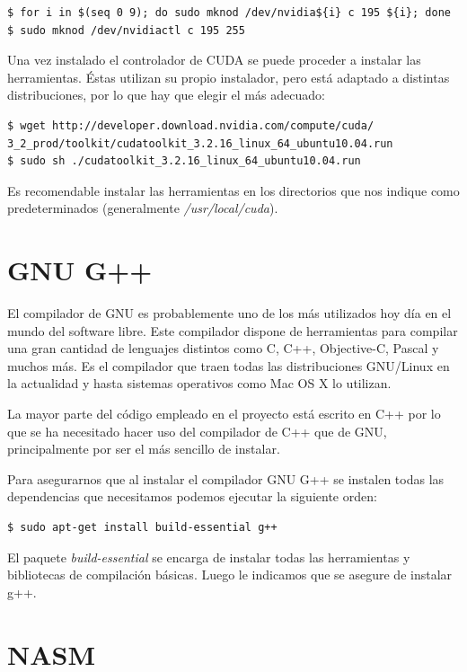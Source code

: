 \begin{verbatim}
$ for i in $(seq 0 9); do sudo mknod /dev/nvidia${i} c 195 ${i}; done
$ sudo mknod /dev/nvidiactl c 195 255
\end{verbatim}

Una vez instalado el controlador de CUDA se puede proceder a instalar las herramientas. Éstas utilizan su propio instalador, pero está adaptado a distintas distribuciones, por lo que hay que elegir el más adecuado:

\begin{verbatim}
$ wget http://developer.download.nvidia.com/compute/cuda/
3_2_prod/toolkit/cudatoolkit_3.2.16_linux_64_ubuntu10.04.run
$ sudo sh ./cudatoolkit_3.2.16_linux_64_ubuntu10.04.run
\end{verbatim}

Es recomendable instalar las herramientas en los directorios que nos indique como predeterminados (generalmente \emph{/usr/local/cuda}).

\section{GNU G++}

El compilador de GNU es probablemente uno de los más utilizados hoy día en el mundo del software libre. Este compilador dispone de herramientas para compilar una gran cantidad de lenguajes distintos como C, C++, Objective-C, Pascal y muchos más. Es el compilador que traen todas las distribuciones GNU/Linux en la actualidad y hasta sistemas operativos como Mac OS X lo utilizan.

La mayor parte del código empleado en el proyecto está escrito en C++ por lo que se ha necesitado hacer uso del compilador de C++ que de GNU, principalmente por ser el más sencillo de instalar.

Para asegurarnos que al instalar el compilador GNU G++ se instalen todas las dependencias que necesitamos podemos ejecutar la siguiente orden:

\begin{verbatim}
$ sudo apt-get install build-essential g++
\end{verbatim}

El paquete \emph{build-essential} se encarga de instalar todas las herramientas y bibliotecas de compilación básicas. Luego le indicamos que se asegure de instalar g++.

\section{NASM}

